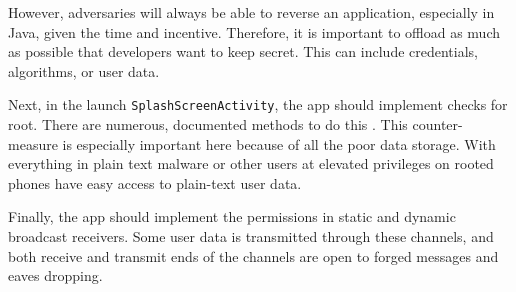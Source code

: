 \documentclass[conference,compsoc]{IEEEtran}
\begin{document}
However, adversaries will always be able to reverse an application, especially in Java, given the time and incentive. Therefore, it is important to offload as much as possible that developers want to keep secret. This can include credentials, algorithms, or user data.

Next, in the launch \texttt{SplashScreenActivity}, the app should implement checks for root. There are numerous, documented methods to do this \cite{owaspbinary}. This counter-measure is especially important here because of all the poor data storage. With everything in plain text malware or other users at elevated privileges on rooted phones have easy access to plain-text user data. 

Finally, the app should implement the permissions in static and dynamic broadcast receivers. Some user data is transmitted through these channels, and both receive and transmit ends of the channels are open to forged messages and eaves dropping.


\clearpage
\newpage
{}

\end{document}
